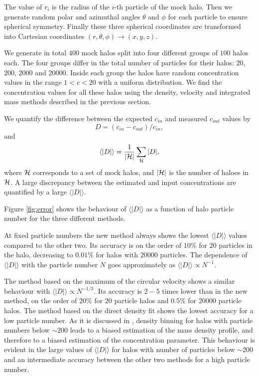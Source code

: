 \documentclass[a4,useAMS,usenatbib,usegraphicx]{mn2e}
\newcommand{\avg}[1]{\langle{#1}\rangle}
\begin{document}
The value of $r_i$ is the radius of the $i$-th particle of the mock
halo.  
Then we generate random polar and azimuthal angles $\theta$ and
$\phi$ for each particle to ensure spherical symmetry.  
Finally these three spherical coordinates are transformed into
Cartesian coordinates $(r,\theta,\phi) \rightarrow (x,y,z)$.

We generate in total $400$ mock halos split into four different groups
of $100$ halos each.  
The four groups differ in the total number of particles for their
halos: $20$, $200$, $2000$ and $20000$.   
Inside each group the halos have random concentration values in the range
$1<c<20$ with a uniform distribution.  
We find the concentration values for all these halos using the
density, velocity and integrated mass methods described in the
previous section.    

We quantify the difference between the expected $c_{in}$ and measured
$c_{out}$ values by 
%
\begin{equation}
D=(c_{in}-c_{out})/c_{in},
\label{eq:D}
\end{equation}
%
and
%
\begin{equation}
\avg{|D|}=\frac{1}{\left|{\cal{H}}\right|}\sum_{{\cal{H}}} |D|,
\end{equation}
%
where ${\cal{H}}$ corresponds to a set of mock halos, and
$\left|{\cal{H}}\right|$ is the number of haloes in ${\cal{H}}$. 
A large discrepancy between the estimated and input concentrations are
quantified by a large $\avg{|D|}$.


Figure \ref{fig:error} shows the behaviour of $\avg{|D|}$ as a function of
halo particle number for the three different methods.

At fixed particle numbers the new method always shows the lowest
$\avg{|D|}$ values compared to the other two.
Its accuracy is on the order of $10\%$ for $20$ particles in the halo,
decreasing to $0.01\%$ for halos with $20000$ particles.  
The dependence of $\avg{|D|}$ with the particle number $N$
goes approximately as $\avg{|D|}\propto N^{-1}$.   

The method based on the maximum of the circular velocity shows a
similar behaviour with $\avg{|D|}\propto N^{-1/3}$.  
Its accuracy is $2-5$ times lower than in the new method, on the order of
$20\%$ for $20$ particle halos and $0.5\%$ for $20000$ particle
halos. 
The method  based on the direct density fit shows the lowest accuracy for a low
  particle number. 
  As it is discussed in \citep{Munoz2011}, density binning for halos
  with particle numbers below $\sim200$ leads to a biased estimation
  of the mass density profile, and therefore to a biased estimation of
  the concentration parameter. 
This behaviour is evident in the large values of $\avg{|D|}$ for halos
with number of particles below $\sim 200$ and an intermediate accuracy
between the other two methods for a high particle number. 
\end{document}
